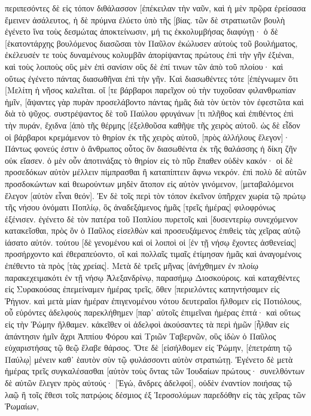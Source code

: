 περιπεσόντες δὲ εἰς τόπον διθάλασσον [ἐπέκειλαν τὴν ναῦν, καὶ ἡ μὲν πρῷρα ἐρείσασα ἔμεινεν ἀσάλευτος, ἡ δὲ πρύμνα ἐλύετο ὑπὸ τῆς [βίας. 
τῶν δὲ στρατιωτῶν βουλὴ ἐγένετο ἵνα τοὺς δεσμώτας ἀποκτείνωσιν, μή τις ἐκκολυμβήσας διαφύγῃ· 
ὁ δὲ [ἑκατοντάρχης βουλόμενος διασῶσαι τὸν Παῦλον ἐκώλυσεν αὐτοὺς τοῦ βουλήματος, ἐκέλευσέν τε τοὺς δυναμένους κολυμβᾶν ἀπορίψαντας πρώτους ἐπὶ τὴν γῆν ἐξιέναι, 
καὶ τοὺς λοιποὺς οὓς μὲν ἐπὶ σανίσιν οὓς δὲ ἐπί τινων τῶν ἀπὸ τοῦ πλοίου· καὶ οὕτως ἐγένετο πάντας διασωθῆναι ἐπὶ τὴν γῆν. 
Καὶ διασωθέντες τότε [ἐπέγνωμεν ὅτι [Μελίτη ἡ νῆσος καλεῖται. 
οἵ [τε βάρβαροι παρεῖχον οὐ τὴν τυχοῦσαν φιλανθρωπίαν ἡμῖν, [ἅψαντες γὰρ πυρὰν προσελάβοντο πάντας ἡμᾶς διὰ τὸν ὑετὸν τὸν ἐφεστῶτα καὶ διὰ τὸ ψῦχος. 
συστρέψαντος δὲ τοῦ Παύλου φρυγάνων [τι πλῆθος καὶ ἐπιθέντος ἐπὶ τὴν πυράν, ἔχιδνα [ἀπὸ τῆς θέρμης [ἐξελθοῦσα καθῆψε τῆς χειρὸς αὐτοῦ. 
ὡς δὲ εἶδον οἱ βάρβαροι κρεμάμενον τὸ θηρίον ἐκ τῆς χειρὸς αὐτοῦ, [πρὸς ἀλλήλους ἔλεγον]· Πάντως φονεύς ἐστιν ὁ ἄνθρωπος οὗτος ὃν διασωθέντα ἐκ τῆς θαλάσσης ἡ δίκη ζῆν οὐκ εἴασεν. 
ὁ μὲν οὖν ἀποτινάξας τὸ θηρίον εἰς τὸ πῦρ ἔπαθεν οὐδὲν κακόν· 
οἱ δὲ προσεδόκων αὐτὸν μέλλειν πίμπρασθαι ἢ καταπίπτειν ἄφνω νεκρόν. ἐπὶ πολὺ δὲ αὐτῶν προσδοκώντων καὶ θεωρούντων μηδὲν ἄτοπον εἰς αὐτὸν γινόμενον, [μεταβαλόμενοι ἔλεγον [αὐτὸν εἶναι θεόν]. 
Ἐν δὲ τοῖς περὶ τὸν τόπον ἐκεῖνον ὑπῆρχεν χωρία τῷ πρώτῳ τῆς νήσου ὀνόματι Ποπλίῳ, ὃς ἀναδεξάμενος ἡμᾶς [τρεῖς ἡμέρας] φιλοφρόνως ἐξένισεν. 
ἐγένετο δὲ τὸν πατέρα τοῦ Ποπλίου πυρετοῖς καὶ [δυσεντερίῳ συνεχόμενον κατακεῖσθαι, πρὸς ὃν ὁ Παῦλος εἰσελθὼν καὶ προσευξάμενος ἐπιθεὶς τὰς χεῖρας αὐτῷ ἰάσατο αὐτόν. 
τούτου [δὲ γενομένου καὶ οἱ λοιποὶ οἱ [ἐν τῇ νήσῳ ἔχοντες ἀσθενείας] προσήρχοντο καὶ ἐθεραπεύοντο, 
οἳ καὶ πολλαῖς τιμαῖς ἐτίμησαν ἡμᾶς καὶ ἀναγομένοις ἐπέθεντο τὰ πρὸς [τὰς χρείας]. 
Μετὰ δὲ τρεῖς μῆνας [ἀνήχθημεν ἐν πλοίῳ παρακεχειμακότι ἐν τῇ νήσῳ Ἀλεξανδρίνῳ, παρασήμῳ Διοσκούροις. 
καὶ καταχθέντες εἰς Συρακούσας ἐπεμείναμεν ἡμέρας τρεῖς, 
ὅθεν [περιελόντες κατηντήσαμεν εἰς Ῥήγιον. καὶ μετὰ μίαν ἡμέραν ἐπιγενομένου νότου δευτεραῖοι ἤλθομεν εἰς Ποτιόλους, 
οὗ εὑρόντες ἀδελφοὺς παρεκλήθημεν [παρ᾽ αὐτοῖς ἐπιμεῖναι ἡμέρας ἑπτά· καὶ οὕτως εἰς τὴν Ῥώμην ἤλθαμεν. 
κἀκεῖθεν οἱ ἀδελφοὶ ἀκούσαντες τὰ περὶ ἡμῶν [ἦλθαν εἰς ἀπάντησιν ἡμῖν ἄχρι Ἀππίου Φόρου καὶ Τριῶν Ταβερνῶν, οὓς ἰδὼν ὁ Παῦλος εὐχαριστήσας τῷ θεῷ ἔλαβε θάρσος. 
Ὅτε δὲ [εἰσήλθομεν εἰς Ῥώμην, [ἐπετράπη τῷ Παύλῳ] μένειν καθ᾽ ἑαυτὸν σὺν τῷ φυλάσσοντι αὐτὸν στρατιώτῃ. 
Ἐγένετο δὲ μετὰ ἡμέρας τρεῖς συγκαλέσασθαι [αὐτὸν τοὺς ὄντας τῶν Ἰουδαίων πρώτους· συνελθόντων δὲ αὐτῶν ἔλεγεν πρὸς αὐτούς· [Ἐγώ, ἄνδρες ἀδελφοί], οὐδὲν ἐναντίον ποιήσας τῷ λαῷ ἢ τοῖς ἔθεσι τοῖς πατρῴοις δέσμιος ἐξ Ἱεροσολύμων παρεδόθην εἰς τὰς χεῖρας τῶν Ῥωμαίων, 
